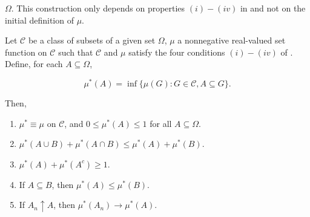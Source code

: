 \(\Omega\). This construction only depends on properties \((i)-(iv)\) in
 and not on the initial definition of
\(\mu\).
\begin{lemm}\label{lemma:extension to outer measure properties} Let \(\mathcal{C}\) be a
class of subsets of a given set \(\Omega\), \(\mu\) a nonnegative real-valued
set function on \(\mathcal{C}\) such that \(\mathcal{C}\) and \(\mu\) satisfy the four conditions
\((i)-(iv)\) of . Define, for each
\(A\subseteq\Omega\),
	
	\[\mu^*(A)=\inf\{\mu(G):G\in\mathcal{C},A\subseteq G\}.\]
	
	Then,
	\begin{enumerate}
		\item \label{lemma:extension to outer measure coincides and is bounded}
\(\mu^*\equiv\mu\) on \(\mathcal{C}\), and \(0\leq\mu^*(A)\leq1\) for all
\(A\subseteq\Omega\).
		\item \label{lemma:extension to outer measure
subadditivity}\(\mu^*(A\cup B)+\mu^*(A\cap B)\leq\mu^*(A)+\mu^*(B)\).
		\item \label{lemma:defining property of
Hcal}\(\mu^*(A)+\mu^*(A^c)\geq1\).
		\item \label{lemma:extension to outer measure monotonicity} If
\(A\subseteq B\), then \(\mu^*(A)\leq\mu^*(B)\).
		\item \label{lemma:extension to outer measure increasing limits} If
\(A_n\uparrow A\), then \(\mu^*(A_n)\to\mu^*(A)\).
	\end{enumerate}    
\end{lemm}
